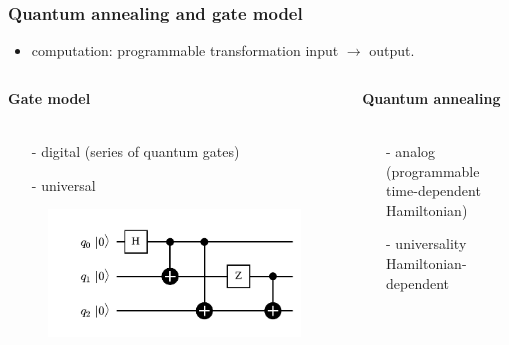\documentclass[11pt]{beamer}
\newcommand{\itemb}{\item[$\bullet$]}
\begin{document}
\begin{frame}
    \frametitle{Quantum annealing and gate model}
    \begin{itemize}
        \setlength{\itemindent}{-1em}
        \itemb computation: programmable transformation input $\to$ output.
    \end{itemize}
    \vspace*{0.3cm}
    \begin{columns}[T]
        \begin{column}{0.45\textwidth}
            \centering
            \textbf{Gate model} \\
            \hrulefill \\
            \begin{itemize}
                \item [-] digital (series of quantum gates)
                \item [-] universal
            \end{itemize}
            \begin{figure}[!htb]
                \centering
                \includegraphics[width=\textwidth]{../plots/quantum_circuit.pdf}
                \label{fig:circuit}
            \end{figure}
        \end{column}
        \begin{column}{0.55\textwidth}
            \centering
            \textbf{Quantum annealing} \\
            \hrulefill \\
            \begin{itemize}
                \item [-] analog (programmable time-dependent Hamiltonian)
                \item [-] universality Hamiltonian-dependent
            \end{itemize}

\end{column}
\end{columns}
\end{frame}
\end{document}
